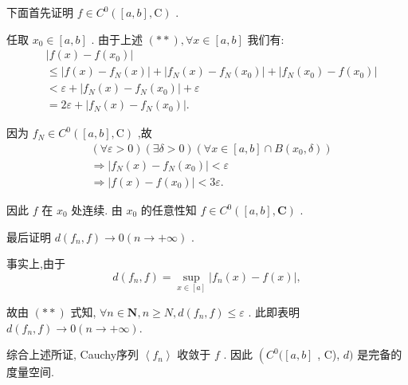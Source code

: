 下面首先证明 $f \in  {C}^{0}\left( {\left\lbrack  {a,b}\right\rbrack  ,\mathrm{C}}\right)$ .

任取 ${x}_{0} \in  \left\lbrack  {a,b}\right\rbrack$ . 由于上述 $\left( {* * }\right) ,\forall x \in  \left\lbrack  {a,b}\right\rbrack$ 我们有:
\begin{align*}
	&\left| {f\left( x\right)  - f\left( {x}_{0}\right) }\right|\\
	&\leq  \left| {f\left( x\right)  - {f}_{N}\left( x\right) }\right|  + \left| {{f}_{N}\left( x\right)  - {f}_{N}\left( {x}_{0}\right) }\right|  + \left| {{f}_{N}\left( {x}_{0}\right)  - f\left( {x}_{0}\right) }\right|\\
	&< \varepsilon  + \left| {{f}_{N}\left( x\right)  - {f}_{N}\left( {x}_{0}\right) }\right|  + \varepsilon\\
	&= {2\varepsilon } + \left| {{f}_{N}\left( x\right)  - {f}_{N}\left( {x}_{0}\right) }\right| .
\end{align*}

因为 ${f}_{N} \in  {C}^{0}\left( {\left\lbrack  {a,b}\right\rbrack  ,\mathrm{C}}\right)$ ,故
\begin{align*}
	&\left( {\forall \varepsilon  > 0}\right) \left( {\exists \delta  > 0}\right) \left( {\forall x \in  \left\lbrack  {a,b}\right\rbrack   \cap  B\left( {{x}_{0},\delta }\right) }\right)\\
	&\Rightarrow  \left| {{f}_{N}\left( x\right)  - {f}_{N}\left( {x}_{0}\right) }\right|  < \varepsilon\\
	&\Rightarrow  \left| {f\left( x\right)  - f\left( {x}_{0}\right) }\right|  < {3\varepsilon }.
\end{align*}

因此 $f$ 在 ${x}_{0}$ 处连续. 由 ${x}_{0}$ 的任意性知 $f \in  {C}^{0}\left( {\left\lbrack  {a,b}\right\rbrack  ,\mathbf{C}}\right)$ .

最后证明 $d\left( {{f}_{n},f}\right)  \rightarrow  0\left( {n \rightarrow   + \infty }\right)$ .

事实上,由于
$$d\left( {{f}_{n},f}\right)  = \mathop{\sup }\limits_{{x \in  \left\lbrack  a\right\rbrack  }}\left| {{f}_{n}\left( x\right)  - f\left( x\right) }\right| ,$$

故由 $\left( {* * }\right)$ 式知, $\forall n \in  \mathbf{N},n \geq  N,d\left( {{f}_{n},f}\right)  \leq  \varepsilon$ . 此即表明 $d\left( {{f}_{n},f}\right)  \rightarrow  0\left( {n \rightarrow   + \infty }\right) .$

综合上述所证, Cauchy序列 $\left\langle  {f}_{n}\right\rangle$ 收敛于 $f$ . 因此 $\left( {{C}^{0}(\left\lbrack  {a,b}\right\rbrack  }\right.$ , C), $d)$ 是完备的度量空间.

